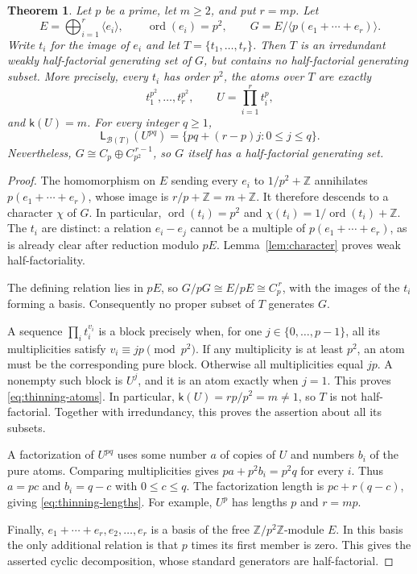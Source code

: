 \documentclass[11pt,reqno]{amsart}
\numberwithin{equation}{section}
\newtheorem{theorem}{Theorem}[section]
\theoremstyle{definition}
\theoremstyle{remark}
\newcommand{\Z}{\mathbb Z}
\newcommand{\B}{\mathcal B}
\newcommand{\LL}{\mathsf L}
\DeclareMathOperator{\ord}{ord}
\begin{document}
\begin{theorem}\label{thm:no-thinning}
Let $p$ be a prime, let $m\ge2$, and put $r=mp$. Let
\[
 E=\bigoplus_{i=1}^{r}\langle e_i\rangle,
 \qquad \ord(e_i)=p^2,
 \qquad G=E/\langle p(e_1+\cdots+e_r)\rangle.
\]
Write $t_i$ for the image of $e_i$ and let $T=\{t_1,\ldots,t_r\}$.
Then $T$ is an irredundant weakly half-factorial generating set of
$G$, but contains no half-factorial generating subset. More
precisely, every $t_i$ has order $p^2$, the atoms over $T$ are exactly
\begin{equation}\label{eq:thinning-atoms}
 t_1^{p^2},\ldots,t_r^{p^2},
 \qquad U=\prod_{i=1}^{r}t_i^p,
\end{equation}
and $\mathsf k(U)=m$. For every integer $q\ge1$,
\begin{equation}\label{eq:thinning-lengths}
 \LL_{\B(T)}(U^{pq})
   =\{pq+(r-p)j:0\le j\le q\}.
\end{equation}
Nevertheless, $G\cong C_p\oplus C_{p^2}^{\,r-1}$, so $G$ itself
has a half-factorial generating set.
\end{theorem}

\begin{proof}
The homomorphism on $E$ sending every $e_i$ to $1/p^2+\Z$
annihilates $p(e_1+\cdots+e_r)$, whose image is $r/p+\Z=m+\Z$.
It therefore descends to a character $\chi$ of $G$. In particular,
$\ord(t_i)=p^2$ and $\chi(t_i)=1/\ord(t_i)+\Z$. The $t_i$
are distinct: a relation $e_i-e_j$ cannot be a multiple of
$p(e_1+\cdots+e_r)$, as is already clear after reduction modulo
$pE$. Lemma~\ref{lem:character} proves weak half-factoriality.

The defining relation lies in $pE$, so
$G/pG\cong E/pE\cong C_p^{\,r}$, with the images of the $t_i$
forming a basis. Consequently no proper subset of $T$ generates
$G$.

A sequence $\prod_i t_i^{v_i}$ is a block precisely when, for one
$j\in\{0,\ldots,p-1\}$, all its multiplicities satisfy
$v_i\equiv jp\pmod{p^2}$. If any multiplicity is at least $p^2$,
an atom must be the corresponding pure block. Otherwise all
multiplicities equal $jp$. A nonempty such block is $U^j$, and
it is an atom exactly when $j=1$. This proves
\eqref{eq:thinning-atoms}. In particular,
$\mathsf k(U)=rp/p^2=m\ne1$, so $T$ is not half-factorial.
Together with irredundancy, this proves the assertion about all
its subsets.

A factorization of $U^{pq}$ uses some number $a$ of copies of
$U$ and numbers $b_i$ of the pure atoms. Comparing multiplicities
gives $pa+p^2b_i=p^2q$ for every $i$. Thus $a=pc$ and
$b_i=q-c$ with $0\le c\le q$. The factorization length is
$pc+r(q-c)$, giving \eqref{eq:thinning-lengths}. For example,
$U^p$ has lengths $p$ and $r=mp$.

Finally, $e_1+\cdots+e_r,e_2,\ldots,e_r$ is a basis of the
free $\Z/p^2\Z$-module $E$. In this basis the only additional
relation is that $p$ times its first member is zero. This gives
the asserted cyclic decomposition, whose standard generators
are half-factorial.
\end{proof}
\end{document}
